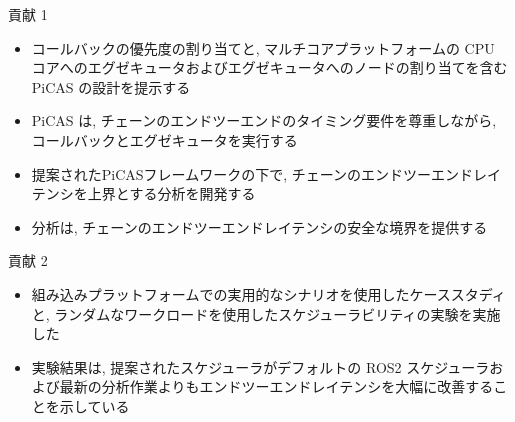 \begin{frame}{貢献 1}
    \begin{itemize}
        \item  コールバックの優先度の割り当てと, マルチコアプラットフォームの CPU コアへのエグゼキュータおよびエグゼキュータへのノードの割り当てを含む PiCAS の設計を提示する
        \item PiCAS は, チェーンのエンドツーエンドのタイミング要件を尊重しながら, コールバックとエグゼキュータを実行する
        \item  提案されたPiCASフレームワークの下で, チェーンのエンドツーエンドレイテンシを上界とする分析を開発する
        \item 分析は, チェーンのエンドツーエンドレイテンシの安全な境界を提供する
    \end{itemize}
\end{frame}

\begin{frame}{貢献 2}
    \begin{itemize}
        \item 組み込みプラットフォームでの実用的なシナリオを使用したケーススタディと, ランダムなワークロードを使用したスケジューラビリティの実験を実施した
        \item 実験結果は, 提案されたスケジューラがデフォルトの ROS2 スケジューラおよび最新の分析作業よりもエンドツーエンドレイテンシを大幅に改善することを示している
    \end{itemize}
\end{frame}

